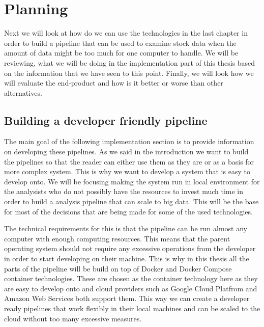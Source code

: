 \chapter{Planning}
\label{chapter:methods}


Next we will look at how do we can use the technologies in the last chapter in order to build a pipeline that can be used to examine stock data when the amount of data might be too much for one computer to handle.
We will be reviewing, what we will be doing in the implementation part of this thesis based on the information that we have seen to this point.
Finally, we will look how we will evaluate the end-product and how is it better or worse than other alternatives.

\section{Building a developer friendly pipeline}

The main goal of the following implementation section is to provide information on developing these pipelines.
As we said in the introduction we want to build the pipelines so that the reader can either use them as they are or as a basis for more complex system.
This is why we want to develop a system that is easy to develop onto.
We will be focusing making the system run in local environment for the analysists who do not possibly have the resources to invest much time in order to build a analysis pipeline that can scale to big data.
This will be the base for most of the decisions that are being made for some of the used technologies.

The technical requirements for this is that the pipeline can be run almost any computer with enough computing resources.
This means that the parent operating system should not require any excessive operations from the developer in order to start developing on their machine.
This is why in this thesis all the parts of the pipeline will be build on top of Docker and Docker Compose container technologies.
These are chosen as the container technology here as they are easy to develop onto and cloud providers such as Google Cloud Platfrom and Amazon Web Services both support them. \cite{awsdocker} \cite{gcpdocker}
This way we can create a developer ready pipelines that work flexibly in their local machines and can be scaled to the cloud without too many excessive measures.

